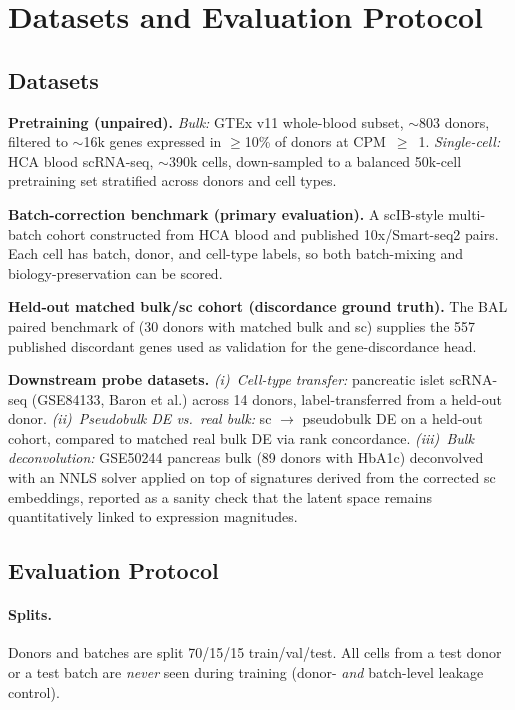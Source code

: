 \documentclass[11pt]{article}
\begin{document}
\section{Datasets and Evaluation Protocol}

\subsection{Datasets}

\textbf{Pretraining (unpaired).}
\emph{Bulk:} GTEx v11 whole-blood subset, $\sim$803 donors, filtered to
$\sim$16k genes expressed in $\geq$10\% of donors at CPM~$\geq$~1.
\emph{Single-cell:} HCA blood scRNA-seq, $\sim$390k cells, down-sampled to a
balanced 50k-cell pretraining set stratified across donors and cell types.

\textbf{Batch-correction benchmark (primary evaluation).}
A scIB-style multi-batch cohort constructed from HCA blood and published
10x/Smart-seq2 pairs. Each cell has batch, donor, and cell-type labels, so
both batch-mixing and biology-preservation can be scored.

\textbf{Held-out matched bulk/sc cohort (discordance ground truth).}
The BAL paired benchmark of \citet{hu-2026-bal} (30 donors with matched bulk
and sc) supplies the 557 published discordant genes used as validation for
the gene-discordance head.

\textbf{Downstream probe datasets.}
\emph{(i)~Cell-type transfer:} pancreatic islet scRNA-seq (GSE84133, Baron et
al.) across 14 donors, label-transferred from a held-out donor.
\emph{(ii)~Pseudobulk DE vs.\ real bulk:} sc $\to$ pseudobulk DE on a held-out
cohort, compared to matched real bulk DE via rank concordance.
\emph{(iii)~Bulk deconvolution:} GSE50244 pancreas bulk (89 donors with
HbA1c) deconvolved with an NNLS solver applied on top of signatures derived
from the corrected sc embeddings, reported as a sanity check that the latent
space remains quantitatively linked to expression magnitudes.

\subsection{Evaluation Protocol}

\paragraph{Splits.} Donors and batches are split 70/15/15 train/val/test. All
cells from a test donor or a test batch are \emph{never} seen during training
(donor- \emph{and} batch-level leakage control).
\end{document}
